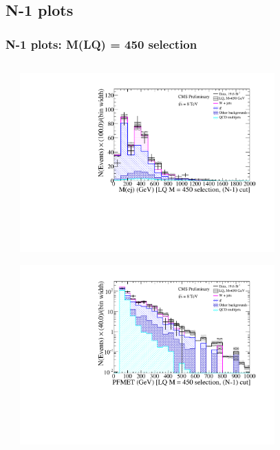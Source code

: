 \documentclass[bigger]{beamer}
\begin{document}
\subsection{\enujj N-1 plots}
\label{sec-1-13}
\begin{frame}
\frametitle{\enujj N-1 plots: M(LQ) = 450 selection}
\label{sec-1-13-1}
\begin{columns} %
\label{sec-1-13-1-1}
\begin{column}{0.55\textwidth}
\label{sec-1-13-1-1-1}
\label{sec-1-13-1-1-1-1}

\centering
\includegraphics[width=0.8\textwidth]{fig/enu/nMinus1/Mej_stAndMtAndMetLQ450_enujj.pdf}
\label{sec-1-13-1-1-1-2}

\centering
\includegraphics[width=0.8\textwidth]{fig/enu/nMinus1/MET_stAndMtAndMejLQ450_enujj.pdf}
\end{column}
\begin{column}{0.55\textwidth}
\label{sec-1-13-1-1-2}
\label{sec-1-13-1-1-2-1}


\end{column}
\end{columns}
\end{frame}
\end{document}
